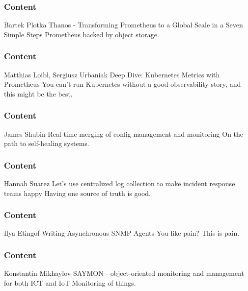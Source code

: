 \documentclass[aspectratio=169]{beamer}
\begin{document}
\begin{frame}
	\frametitle{Content}
	\begin{center}
		\vfill
		Bartek Plotka
		\vfill
		Thanos - Transforming Prometheus to a Global Scale in a Seven Simple Steps
		\vfill
		Prometheus backed by object storage.
		\vfill
	\end{center}
\end{frame}

\begin{frame}
	\frametitle{Content}
	\begin{center}
		\vfill
		Matthias Loibl, Sergiusz Urbaniak
		\vfill
		Deep Dive: Kubernetes Metrics with Prometheus
		\vfill
		You can't run Kubernetes without a good observability story, and this might be the best.
		\vfill
	\end{center}
\end{frame}

\begin{frame}
	\frametitle{Content}
	\begin{center}
		\vfill
		James Shubin
		\vfill
		Real-time merging of config management and monitoring
		\vfill
		On the path to self-healing systems.
		\vfill
	\end{center}
\end{frame}

\begin{frame}
	\frametitle{Content}
	\begin{center}
		\vfill
		Hannah Suarez
		\vfill
		Let's use centralized log collection to make incident response teams happy
		\vfill
		Having one source of truth is good.
		\vfill
	\end{center}
\end{frame}

\begin{frame}
	\frametitle{Content}
	\begin{center}
		\vfill
		Ilya Etingof
		\vfill
		Writing Asynchronous SNMP Agents
		\vfill
		You like pain? This is pain.
		\vfill
	\end{center}
\end{frame}

\begin{frame}
	\frametitle{Content}
	\begin{center}
		\vfill
		Konstantin Mikhaylov
		\vfill
		SAYMON - object-oriented monitoring and management for both ICT and IoT
		\vfill
		Monitoring of things.
		\vfill
	\end{center}
\end{frame}
\end{document}
